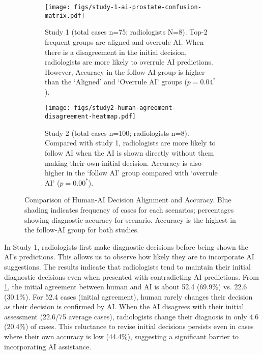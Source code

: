 \begin{figure}[t]
  \centering
  \begin{subfigure}[c]{0.6\textwidth}
    \centering
    \texttt{[image: figs/study-1-ai-prostate-confusion-matrix.pdf]}
    \caption{Study 1 (total cases n=75; radiologists N=8). Top-2 frequent groups are aligned and overrule AI. When there is a disagreement in the initial decision, radiologists are more likely to overrule AI predictions. However, Accuracy in the follow-AI group is higher than the `Aligned' and `Overrule AI' groups ($p=0.04^*$).
    }
    \label{fig:study1}
  \end{subfigure}
  \hspace{0.05\textwidth} %
  \begin{subfigure}[c]{0.3\textwidth}
    \centering
    \texttt{[image: figs/study2-human-agreement-disagreement-heatmap.pdf]}
    \caption{Study 2 (total cases n=100; radiologists n=8). Compared with study 1, radiologists are more likely to follow AI when the AI is shown directly without them making their own initial decision. Accuracy is also higher in the `follow AI' group compared with `overrule AI' ($p=0.00^*$). }
    \label{fig:study2}
  \end{subfigure}
  \caption{Comparison of Human-AI Decision Alignment and Accuracy. 
  Blue shading indicates frequency of cases for each scenarios; percentages showing diagnostic accuracy for scenario. 
  Accuracy is the highest in the follow-AI group for both studies. 
  }
  \label{fig:comparison}
\end{figure}




In Study 1, radiologists first make diagnostic decisions before being shown the AI's predictions. This allows us to observe how likely they are to incorporate AI suggestions. 
The results indicate that radiologists tend to maintain their initial diagnostic decisions even when presented with contradicting AI predictions.
From \cref{fig:study1}, the initial agreement between human and AI is about 52.4 (69.9\%) vs. 22.6 (30.1\%). For 52.4 cases (initial agreement), human rarely changes their decision as their decision is confirmed by AI. 
When the AI disagrees with their initial assessment (22.6/75 average cases), radiologists change their diagnosis in only 4.6 (20.4\%) of cases.
This reluctance to revise initial decisions persists even in cases where their own accuracy is low (44.4\%), suggesting a significant barrier to incorporating AI assistance.

